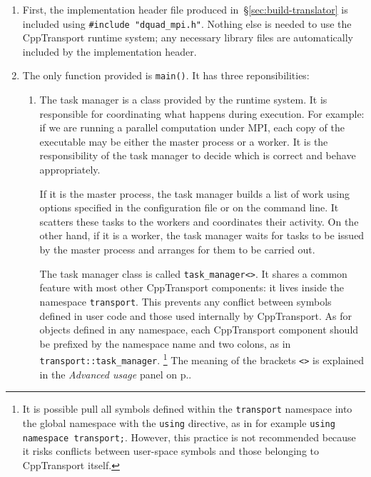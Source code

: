 \documentclass[11pt,a4paper]{article}
\newcommand{\packagefont}{\sffamily}
\newcommand{\CppTransport}{{\packagefont CppTransport}}
\newcommand{\MPI}{{\packagefont MPI}}
\newcommand{\semibold}[1]{{\fontseries{b}\selectfont{#1}}}
\begin{document}
\begin{enumerate}
    \item First, the implementation header file produced in~\S\ref{sec:build-translator}
    is included using \texttt{#include "dquad_mpi.h"}.
    Nothing else is needed to
    use the {\CppTransport} runtime system;
    any necessary library files are automatically included by the implementation header.
    
    \item The only function provided is \texttt{main()}.
    It has three reponsibilities:
    \begin{enumerate}
        \item \semibold{Create a \emph{task manager} instance.}
        The task manager is a
        class provided by the runtime system. It is responsible for coordinating
        what happens during execution.
        For example: if we are running a parallel computation under {\MPI},
        each copy of the executable may be either the master process
        or a worker. It is the responsibility of the task manager
        to decide which is correct and behave appropriately.
        
        If it is the master process, the task
        manager builds a list of work using options specified
        in the configuration file or on the command line.
        It scatters these tasks to the workers and coordinates their activity.
        On the other hand, if it is a worker, the task
        manager waits for tasks to be issued by the master
        process and arranges for them to be carried out.
        
        The task manager class is called
        \texttt{task_manager<>}.
        It shares a common feature with most other {\CppTransport}
        components:
        it lives inside the namespace
        \texttt{transport}.
        This prevents any conflict between symbols
        defined in user code and those used internally by
        {\CppTransport}.
        As for objects defined in any namespace,
        each {\CppTransport} component should be prefixed
        by the namespace name and two colons, as in
        \texttt{transport::task_manager}.%
            \footnote{It is possible pull all symbols defined
            within the \texttt{transport}
            namespace
            into the global
            namespace with the \texttt{using} directive,
            as in for example
            \texttt{using namespace transport;}.
            However, this practice is not recommended because it risks
            conflicts between user-space symbols
            and those belonging to {\CppTransport} itself.}
        The meaning of the brackets
        \texttt{<>}
        is explained in the
        \emph{Advanced usage}
        panel on p.\pageref{advanced:data-type}.
        

\end{enumerate}
\end{enumerate}
\end{document}
